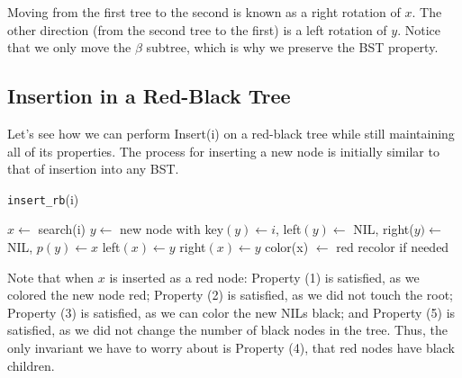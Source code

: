 \documentclass [12pt]{article}
\begin{document}
\begin{center}
\end{center}

Moving from the first tree to the second is known as a right rotation of $x$. The other direction (from the second tree to the first) is a left rotation of $y$. Notice that we only move the $\beta$ subtree, which is why we preserve the BST property.

\subsection{Insertion in a Red-Black Tree}
Let's see how we can perform Insert(i) on a red-black tree while still maintaining all of its properties. The process for inserting a new node is initially similar to that of insertion into any BST.

\begin{algorithm}
\caption{\texttt{insert\_rb}(i)}\label{alg:insert_rb}
\begin{algorithmic}
\STATE $x \gets $ search(i)
\STATE $y \gets$ new node with key$(y) \gets i$, left$(y) \gets$ NIL, right($y) \gets$ NIL, $p(y) \gets x$
  \STATE left$(x) \gets y$
\ELSE
  \STATE right$(x) \gets y$
\ENDIF
\STATE color(x) $\gets $ red
\STATE recolor if needed
\end{algorithmic}
\end{algorithm}

Note that when $x$ is inserted as a red node: Property (1) is satisfied, as we colored the new node red; Property (2) is satisfied, as we did not touch the root; Property (3) is satisfied, as we can color the new NILs black; and Property (5) is satisfied, as we did not change the number of black nodes in the tree. Thus, the only invariant we have to worry about is Property (4), that red nodes have black children. 
\end{document}

